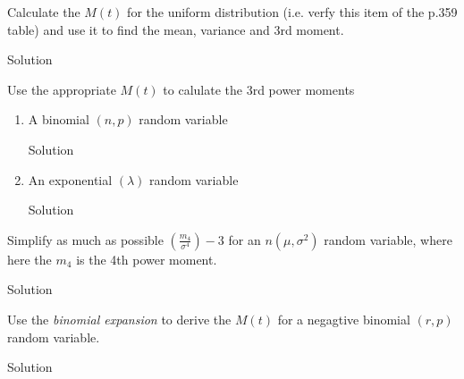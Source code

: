 \documentclass{article}
\begin{document}
\begin{spacing}{1.1}
\maketitle
\newpage
\begin{homeworkProblem}
  Calculate the $M(t)$ for the uniform distribution (i.e. verfy this 
  item of the p.359 table) and use it to find the mean, variance 
  and 3rd moment.
  \begin{homeworkSection}{Solution}
    
  \end{homeworkSection}
\end{homeworkProblem}

\newpage
\begin{homeworkProblem}
  Use the appropriate $M( t)$ to calulate the 3rd power moments

  \begin{enumerate}[(1)]
    \item A binomial $(n, p)$ random variable
      \begin{homeworkSection}{Solution}
        
      \end{homeworkSection}
    \item An exponential $(\lambda)$ random variable
      \begin{homeworkSection}{Solution}
        
      \end{homeworkSection}
  \end{enumerate}
\end{homeworkProblem}

\newpage
\begin{homeworkProblem}
  Simplify as much as possible $\left(\frac{ m_4}{ \sigma^4}\right) - 3$ 
  for an $n(\mu, \sigma^2)$ random variable, where here the $m_4$ is the
  4th power moment.
  \begin{homeworkSection}{Solution}
    
  \end{homeworkSection}
\end{homeworkProblem}

\newpage
\begin{homeworkProblem}
  Use the \emph{binomial expansion} to derive the $M(t)$ for a negagtive
  binomial $(r, p)$ random variable.
  \begin{homeworkSection}{Solution}
    

\end{homeworkSection}
\end{homeworkProblem}
\end{spacing}
\end{document}
